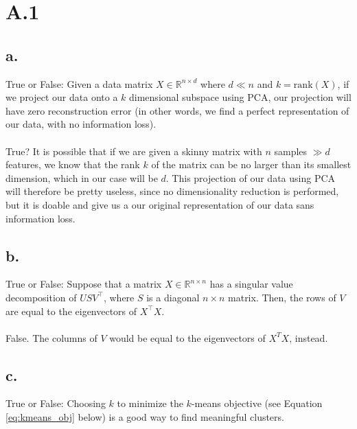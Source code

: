 \documentclass{article}
\date{{}}
\newcommand{\1}{\mathbf{1}}
\begin{document}
\thispagestyle{firstpageheader}

\section*{A.1}
{\Large 

\subsection*{a.}

True or False: Given a data matrix $X \in \mathbb{R}^{n \times d}$ where $d\ll n$ and $k = \mathrm{rank}(X)$, if we project our data onto a $k$ dimensional subspace using PCA, our projection will have zero reconstruction error (in other words, we find a perfect representation of our data, with no information loss). \\ \\

True? It is possible that if we are given a skinny matrix with $n$ samples $\gg d$ features, we know that the rank $k$ of the matrix can be no larger than its smallest dimension, which in our case will be $d$. This projection of our data using PCA will therefore be pretty useless, since no dimensionality reduction is performed, but it is doable and give us a our original representation of our data sans information loss. 

\subsection*{b.}

True or False: Suppose that a matrix $X\in \mathbb{R}^{n \times n}$ has a singular value decomposition of $USV^{\top}$, where $S$ is a diagonal $n \times n$ matrix. Then, the rows of $V$ are equal to the eigenvectors of $X^{\top}X$. \\ \\

False. The columns of $V$ would be equal to the eigenvectors of $X^T X$, instead.

\subsection*{c.}

True or False: Choosing $k$ to minimize the $k$-means objective (see Equation \eqref{eq:kmeans_obj} below) is a good way to find meaningful clusters. \\ \\

}
\end{document}
